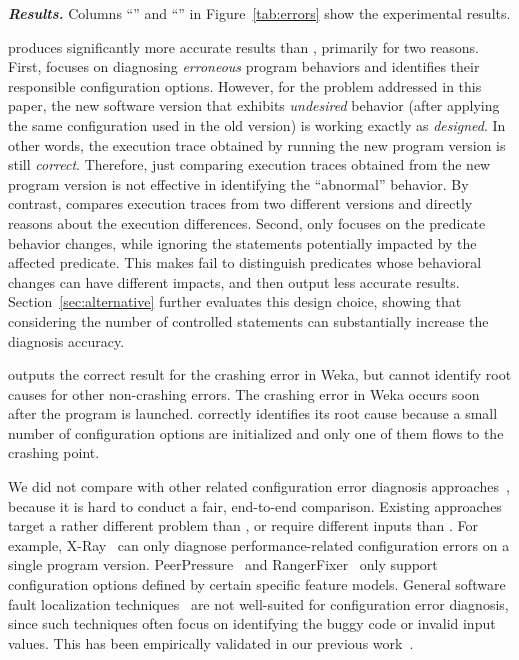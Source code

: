 \vspace{1mm}
\noindent \textbf{\textit{Results.}}
Columns ``\prevtool'' and ``\conftool'' in Figure~\ref{tab:errors} show
the experimental results.

\ourtool produces significantly more accurate results than \prevtool,
primarily for two reasons. First, \prevtool focuses on diagnosing
\textit{erroneous} program behaviors and identifies their responsible
configuration options. However, for the problem addressed in this paper,
the new software version that exhibits \textit{undesired} behavior 
(after applying the same configuration used in the old version)
is working exactly as \textit{designed}. In other words, the execution
trace obtained by running the new program version is still
\textit{correct}. Therefore, just comparing execution traces obtained
from the new program version is not effective in identifying
the ``abnormal'' behavior. By contrast, \ourtool compares execution
traces from two different versions and directly reasons about the
execution differences. Second, \prevtool only focuses on
the predicate behavior changes, while ignoring the statements
potentially impacted by the affected predicate. This makes
\prevtool fail to distinguish predicates whose behavioral changes can
have different impacts, and then output less accurate results.
Section~\ref{sec:alternative} further evaluates this design
choice, showing that considering the number of controlled statements
can substantially increase the diagnosis accuracy.

\conftool outputs the correct result for the crashing error in Weka,
but cannot identify root causes for other non-crashing errors.
The crashing error in Weka occurs soon after the program
is launched. \conftool correctly identifies its root cause because
a small number of configuration options
are initialized and only one of them flows to the crashing point.



We did not compare \ourtool with other related
configuration error diagnosis approaches~\cite{Attariyan:2010:ACT,
xray, Whitaker:2004:CDS, Su:2007:AIC, Wang:2004:AMT, rangefix},
because it is hard to conduct a fair, end-to-end comparison.
Existing approaches target a rather
different problem than \ourtool, or require different
inputs than \ourtool. For example, 
X-Ray~\cite{xray} can only diagnose
performance-related configuration errors on a single
program version.
PeerPressure~\cite{Wang:2004:AMT} and RangerFixer~\cite{rangefix} only
support configuration options defined by certain
specific feature models. 
General software fault localization techniques~\cite{Jones:2002, McCamant:2003}
are not well-suited for configuration error diagnosis, since such techniques
often focus on identifying the buggy code or
invalid input values. This has been empirically
validated in our previous work~\cite{Zhang:2013:ADS}.


